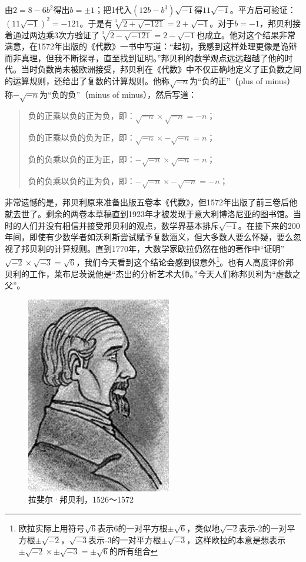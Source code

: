 \documentclass[b5paper]{ctexart}
\begin{document}
由$2 = 8 - 6b^2$得出$b = \pm 1$；把1代入$(12b - b^3)\sqrt{-1}$得$11\sqrt{-1}$。平方后可验证：$(11\sqrt{-1})^2 = -121$。于是有$\sqrt[3]{2 + \sqrt{-121}} = 2 + \sqrt{-1}$。对于$b = -1$，邦贝利接着通过两边乘3次方验证了$\sqrt[3]{2 - \sqrt{-121}} = 2 - \sqrt{-1}$也成立。他对这个结果非常满意，在1572年出版的《代数》一书中写道：“起初，我感到这样处理更像是诡辩而非真理，但我不断探寻，直至找到证明。”\cite{OMerino-2006}邦贝利的数学观点远远超越了他的时代。当时负数尚未被欧洲接受，邦贝利在《代数》中不仅正确地定义了正负数之间的运算规则，还给出了复数的计算规则。他称$\sqrt{-n}$为“负的正”（plus of minus）称$-\sqrt{-n}$为“负的负”（minus of minus），然后写道\cite{MacTour-Bombelli}：

\begin{quotation}
负的正乘以负的正为负，即：$\sqrt{-n} \times \sqrt{-n} = -n$；

负的正乘以负的负为正，即：$\sqrt{-n} \times -\sqrt{-n} = n$；

负的负乘以负的正为正，即：$-\sqrt{-n} \times \sqrt{-n} = n$；

负的负乘以负的正为负，即：$-\sqrt{-n} \times -\sqrt{-n} = -n$；
\end{quotation}

非常遗憾的是，邦贝利原来准备出版五卷本《代数》，但1572年出版了前三卷后他就去世了。剩余的两卷本草稿直到1923年才被发现于意大利博洛尼亚的图书馆。当时的人们并没有相信并接受邦贝利的观点，数学界基本排斥$\sqrt{-1}$。在接下来的200年间，即使有少数学者如沃利斯尝试赋予复数涵义，但大多数人要么怀疑，要么忽视了邦贝利的计算规则。直到1770年，大数学家欧拉仍然在他的著作中“证明”$\sqrt{-2} \times \sqrt{-3} = \sqrt{6}$，我们今天看到这个结论会感到很意外\footnote{欧拉实际上用符号$\sqrt{6}$表示6的一对平方根$\pm\sqrt{6}$，类似地$\sqrt{-2}$表示-2的一对平方根$\pm\sqrt{-2}$，$\sqrt{-3}$表示-3的一对平方根$\pm\sqrt{-3}$，这样欧拉的本意是想表示$\pm \sqrt{-2} \times \pm \sqrt{-3} = \pm \sqrt{6}$的所有组合}。也有人高度评价邦贝利的工作，莱布尼茨说他是“杰出的分析艺术大师。”今天人们称邦贝利为“虚数之父”。

\begin{figure}[htbp]
  \centering
  \includegraphics[scale=0.4]{img/Bombelli}
  \caption{拉斐尔·邦贝利，1526～1572}
 \label{fig:Bombelli}
\end{figure}
\end{document}
